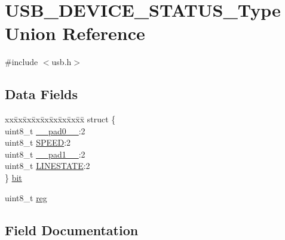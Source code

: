 \hypertarget{union_u_s_b___d_e_v_i_c_e___s_t_a_t_u_s___type}{}\section{U\+S\+B\+\_\+\+D\+E\+V\+I\+C\+E\+\_\+\+S\+T\+A\+T\+U\+S\+\_\+\+Type Union Reference}
\label{union_u_s_b___d_e_v_i_c_e___s_t_a_t_u_s___type}


{\ttfamily \#include $<$usb.\+h$>$}

\subsection*{Data Fields}
\begin{DoxyCompactItemize}
\item 
\begin{tabbing}
xx\=xx\=xx\=xx\=xx\=xx\=xx\=xx\=xx\=\kill
struct \{\\
\>uint8\_t \mbox{\hyperlink{union_u_s_b___d_e_v_i_c_e___s_t_a_t_u_s___type_a8b4eebe79ded0459acec2f4950102ba3}{\_\_pad0\_\_}}:2\\
\>uint8\_t \mbox{\hyperlink{union_u_s_b___d_e_v_i_c_e___s_t_a_t_u_s___type_a7244b81de139c5a3f12fbb9eb8e89647}{SPEED}}:2\\
\>uint8\_t \mbox{\hyperlink{union_u_s_b___d_e_v_i_c_e___s_t_a_t_u_s___type_a77f12d2e278bd5c07712648ac0df5e08}{\_\_pad1\_\_}}:2\\
\>uint8\_t \mbox{\hyperlink{union_u_s_b___d_e_v_i_c_e___s_t_a_t_u_s___type_a5b8b99efdbf90cbb8e924f2fece19dfc}{LINESTATE}}:2\\
\} \mbox{\hyperlink{union_u_s_b___d_e_v_i_c_e___s_t_a_t_u_s___type_a524705c88ccd542509830d94b697d218}{bit}}\\

\end{tabbing}\item 
uint8\+\_\+t \mbox{\hyperlink{union_u_s_b___d_e_v_i_c_e___s_t_a_t_u_s___type_a9428adc9af4653a2050e2536b55dec8d}{reg}}
\end{DoxyCompactItemize}


\subsection{Field Documentation}
\mbox{\label{union_u_s_b___d_e_v_i_c_e___s_t_a_t_u_s___type_a8b4eebe79ded0459acec2f4950102ba3}} 
